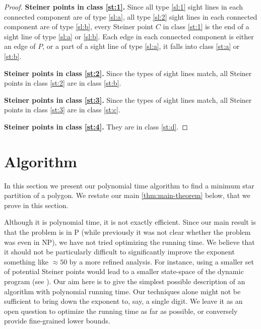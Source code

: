 \documentclass{theoretics}
\begin{document}
\begin{proof}
    \textbf{\boldmath Steiner points in class \ref{st:1}. }
    Since all type \ref{sl:1} sight lines in each connected component are of type \ref{sl:a}, all type \ref{sl:2} sight lines in each connected component are of type \ref{sl:b}, every Steiner point $C$ in class \ref{st:1} is the end of a sight line of type \ref{sl:a} or \ref{sl:b}. 
    Each edge in each connected component is either an edge of $P$, or a part of a sight line of type \ref{sl:a}, it falls into class \ref{st:a} or \ref{st:b}. 

    \textbf{\boldmath Steiner points in class \ref{st:2}. }
    Since the types of sight lines match, all Steiner points in class \ref{st:2} are in class \ref{st:b}. 

    \textbf{\boldmath Steiner points in class \ref{st:3}. }
    Since the types of sight lines match, all Steiner points in class \ref{st:3} are in class \ref{st:c}. 

    \textbf{\boldmath Steiner points in class \ref{st:4}. }
    They are in class \ref{st:d}. 
\end{proof}

\section{Algorithm} 
\label{sec:algorithm}
In this section we present our polynomial time algorithm to find a minimum star partition of a polygon. We restate our main \cref{thm:main-theorem} below, that we prove in this section.

\MainTheorem*

\begin{remark}
\label{rem:alg-running-time}
Although it is polynomial time, it is not exactly efficient. Since our main result is that the problem is in \textsf{P} (while previously it was not clear whether the problem was even in \textsf{NP}), we have not tried optimizing the running time.
We believe that it should not be particularly difficult to significantly improve the exponent something like $\approx 50$ by a more refined analysis.
For instance, using a smaller set of potential Steiner points would lead to a smaller state-space of the dynamic program (see ).
Our aim here is to give the simplest possible description of an algorithm with polynomial running time.
Our techniques alone might not be sufficient to bring down the exponent to, say, a single digit.
We leave it as an open question to optimize the running time as far as possible, or conversely provide fine-grained lower bounds.
\end{remark}
\end{document}
